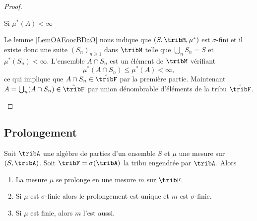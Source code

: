 \begin{proof}
\begin{subproof}
        \item[Si \( \mu^*(A)<\infty\)] 

            Le lemme \ref{LemOAEoocBDaO} nous indique que \( (S,\tribM,\mu^*)\) est \( \sigma\)-fini et il existe donc une suite \( (S_n)_{n\geq 1}\) dans \( \tribM\) telle que \( \bigcup_nS_n=S\) et \( \mu^*(S_n)<\infty\). L'ensemble \( A\cap S_n\) est un élément de \( \tribM\) vérifiant
            \begin{equation}
                \mu^*(A\cap S_n)\leq \mu^*(A)<\infty,
            \end{equation}
            ce qui implique que \( A\cap S_n\in\hat\tribF\) par la première partie. Maintenant \( A=\bigcup_n(A\cap S_n)\in\hat\tribF\) par union dénombrable d'éléments de la tribu \( \hat\tribF\).
    \end{subproof}
\end{proof}

\subsection{Prolongement}

\begin{theorem}    \label{ThoLCQoojiFfZ}
    Soit \( \tribA\) une algèbre de parties d'un ensemble \( S\) et \( \mu\) une mesure sur \( (S,\tribA)\). Soit \( \tribF=\sigma(\tribA)\) la tribu engendrée par \( \tribA\). Alors
    \begin{enumerate}
        \item
            La mesure \( \mu\) se prolonge en une mesure \( m\) sur \( \tribF\).
        \item
            Si \( \mu\) est \( \sigma\)-finie alors le prolongement est unique et \( m\) est \( \sigma\)-finie.
        \item
            Si \( \mu\) est finie, alors \( m\) l'est aussi.
    \end{enumerate}
\end{theorem}

